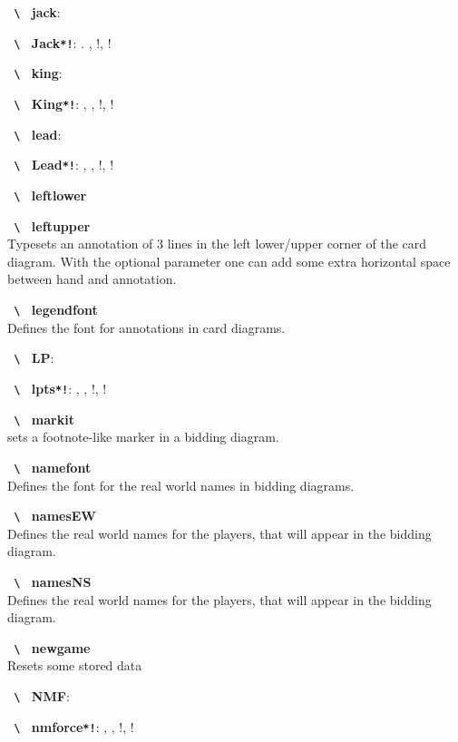 \documentclass[a4paper,fontsize=11pt,%
  danish,%
  dutch,%
  french,%
  german,%
  norsk,%
  spanish,%
  swedish,%
  turkish,%
  english,%
]{scrartcl}
\newcommand\bs{%
  \texttt{%
    \upshape%
    \textbackslash%
  }%
}%
\let\olditem\item
\renewcommand\item[1][\relax]{\olditem\textbf{\bs#1}}
\newcommand\Oarg[1]{\colorbox{optbackgr}{\texttt{#1}}}
\begin{document}
\begin{description}[itemsep=-0.3em]
\item[jack]: \jack
\item[Jack\Oarg{*!}]: \Jack. \Jack*, \Jack!, \Jack*!
 
\item[king]: \king
\item[King\Oarg{*!}]: \King, \King*, \King!, \King*!

\item[lead]: \lead
\item[Lead\Oarg{*!}]: \Lead, \Lead*, \Lead!, \Lead*!

\item[leftlower]

\item[leftupper\Q{[h-offset]{line1}{line2}{line3}}]\\
Typesets an annotation of 3 lines in the left lower/upper corner of the
card diagram. With the optional parameter one can add some extra horizontal
space between hand and annotation.

\item[legendfont]\\
Defines the font for annotations in card diagrams.

\item[LP]: \LP
\item[lpts\Oarg{*!}]: \lpts, \lpts*, \lpts!, \lpts*!

\item[markit]\\
sets a footnote-like marker in a bidding diagram.

\item[namefont]\\
Defines the font for the real world names in bidding diagrams.

\item[namesEW]\\
Defines the real world names for the \eastwest players, that will appear
in the bidding diagram.

\item[namesNS]\\
Defines the real world names for the \northsouth players, that will appear
in the bidding diagram.


\item[newgame]\\
Resets some stored data 

\item[NMF]: \NMF
\item[nmforce\Oarg{*!}]: \nmforce, \nmforce*, \nmforce!, \nmforce*!


\end{description}
\end{document}
